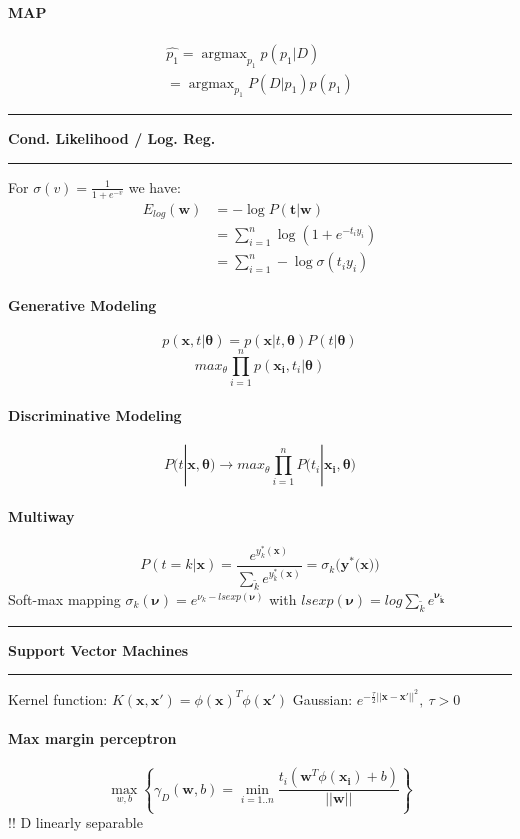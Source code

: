 \documentclass[7pt]{scrartcl}
\newlength{\secskip}
\renewcommand{\section}[1]{
  \vspace{\secskip}
  \hrule\vspace{.3em}
  \textbf{#1}
  \vspace{.3em}
  \hrule
  \vspace{\secskip}
}
\DeclareMathOperator*{\argmax}{argmax}
\renewcommand{\vec}{\mathbf}
\begin{document}
\begin{multicols}{4}
\paragraph{MAP}
\begin{align*}
\hat{p_1} = \argmax_{p_1} p(p_1|D) \\
= \argmax_{p_1} P(D|p_1)p(p_1)
\end{align*}

\section{Cond. Likelihood / Log. Reg.}
For $\sigma(v) = \frac{1}{1+e^{-v}}$ we have:
\begin{align*}
 E_{log}(\vec w) &= - \log P(\vec t | \vec w)\\
 &= \sum\nolimits_{i=1}^n \log \left (1 + e^{-t_iy_i} \right)\\
 &= \sum\nolimits_{i=1}^n -\log \sigma (t_iy_i)
\end{align*}
\paragraph{Generative Modeling}
\[p(\vec{x},t|\vec{\theta}) = p(\vec{x}|t,\vec{\theta})P(t|\vec{\theta}) \]
\[max_{\theta} \prod_{i=1}^n p(\vec{x_i},t_i|\vec{\theta})\]
\paragraph{Discriminative Modeling}
\[P(t|\vec{x,\theta}) \rightarrow max_\theta \prod_{i=1}^n P(t_i|\vec{x_i,\theta)}\]
\paragraph{Multiway}
\[P(t=k|\vec{x}) = \frac{e^{y_k^*(\vec{x})}}{\sum_{\tilde{k}}e^{y_{\tilde{k}}^*(\vec{x})}} = \sigma_k(\vec{y}^*(\vec{x))}\]
Soft-max mapping $\sigma_k(\vec{\nu}) = e^{\nu_k - lsexp(\vec{\nu})}$ with $lsexp(\vec{\nu}) = log \sum_{\tilde{k}}e^{\vec{\nu_{\tilde{k}}}}$

\section{Support Vector Machines}
Kernel function: $K(\vec x, \vec x') = \phi(\vec x)^T\phi(\vec x')$
Gaussian: $e^{-\frac{\tau}{2}||\vec{x}-\vec{x'}||^2}, ~ \tau >0$
\paragraph{Max margin perceptron}
\[\max_{w,b} \left\{ \gamma_D(\vec{w},b) = \min_{i=1..n} \frac{t_i(\vec{w}^T \phi(\vec{x_i}) + b)}{||\vec{w}||} \right\}\]
!! D linearly separable

\end{multicols}
\end{document}
